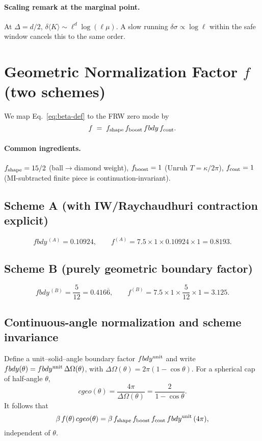 \documentclass[aps,prd,onecolumn,superscriptaddress,nofootinbib]{revtex4-2}
\def\cgeo{cgeo}%
\def\fbdy{fbdy}%
\newcommand{\cgeo}{c_{\rm geo}}
\newcommand{\fbdy}{f_{\rm bdy}}
\begin{document}
\paragraph*{Scaling remark at the marginal point.}
At \(\Delta=d/2\), \(\delta\!\langle K\rangle\sim \ell^{d}\log(\ell\mu)\). A slow running \(\delta\sigma\propto\log \ell\) within the safe window cancels this to the same order.

\section{Geometric Normalization Factor \texorpdfstring{$f$}{f} (two schemes)}
\label{sec:f-norm}
We map Eq.~\eqref{eq:beta-def} to the FRW zero mode by
\begin{equation}
f \;=\; f_{\rm shape}\, f_{\rm boost}\, \fbdy\, f_{\rm cont}.
\end{equation}

\paragraph*{Common ingredients.}
\(f_{\rm shape}=15/2\) (ball\(\to\)diamond weight), \(f_{\rm boost}=1\) (Unruh \(T=\kappa/2\pi\)), \(f_{\rm cont}=1\) (MI-subtracted finite piece is continuation-invariant).

\subsection{Scheme A (with IW/Raychaudhuri contraction explicit)}
\[
\fbdy^{\,(A)}=0.10924,\qquad
f^{(A)}=7.5\times 1 \times 0.10924 \times 1=0.8193.
\]

\subsection{Scheme B (purely geometric boundary factor)}
\[
\fbdy^{\,(B)}=\frac{5}{12}=0.416\overline{6},\qquad
f^{(B)}=7.5\times 1 \times \frac{5}{12}\times 1=3.125.
\]

\subsection{Continuous-angle normalization and scheme invariance}
\label{sec:theta-invariance}
Define a unit–solid–angle boundary factor \(\fbdy^{\rm unit}\) and write
\(\fbdy(\theta)=\fbdy^{\rm unit}\,\Delta\Omega(\theta)\), with \(\Delta\Omega(\theta)=2\pi(1-\cos\theta)\).
For a spherical cap of half-angle \(\theta\),
\begin{equation}
\cgeo(\theta)=\frac{4\pi}{\Delta\Omega(\theta)}=\frac{2}{1-\cos\theta}.
\end{equation}
It follows that
\begin{equation}
\beta\,f(\theta)\,\cgeo(\theta)
= \beta\,f_{\rm shape}\,f_{\rm boost}\,f_{\rm cont}\,\fbdy^{\rm unit}\,(4\pi),
\end{equation}
independent of \(\theta\). 
\end{document}
